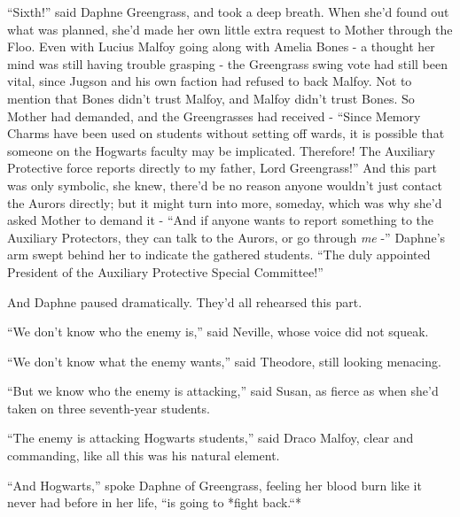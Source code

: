 ``Sixth!'' said Daphne Greengrass, and took a deep breath. When she'd
found out what was planned, she'd made her own little extra request to
Mother through the Floo. Even with Lucius Malfoy going along with Amelia
Bones - a thought her mind was still having trouble grasping - the
Greengrass swing vote had still been vital, since Jugson and his own
faction had refused to back Malfoy. Not to mention that Bones didn't
trust Malfoy, and Malfoy didn't trust Bones. So Mother had demanded, and
the Greengrasses had received - ``Since Memory Charms have been used on
students without setting off wards, it is possible that someone on the
Hogwarts faculty may be implicated. Therefore! The Auxiliary Protective
force reports directly to my father, Lord Greengrass!'' And this part
was only symbolic, she knew, there'd be no reason anyone wouldn't just
contact the Aurors directly; but it might turn into more, someday, which
was why she'd asked Mother to demand it - ``And if anyone wants to
report something to the Auxiliary Protectors, they can talk to the
Aurors, or go through \emph{me} -'' Daphne's arm swept behind her to
indicate the gathered students. ``The duly appointed President of the
Auxiliary Protective Special Committee!''

And Daphne paused dramatically. They'd all rehearsed this part.

``We don't know who the enemy is,'' said Neville, whose voice did not
squeak.

``We don't know what the enemy wants,'' said Theodore, still looking
menacing.

``But we know who the enemy is attacking,'' said Susan, as fierce as
when she'd taken on three seventh-year students.

``The enemy is attacking Hogwarts students,'' said Draco Malfoy, clear
and commanding, like all this was his natural element.

``And Hogwarts,'' spoke Daphne of Greengrass, feeling her blood burn
like it never had before in her life, ``is going to *fight back.``*
